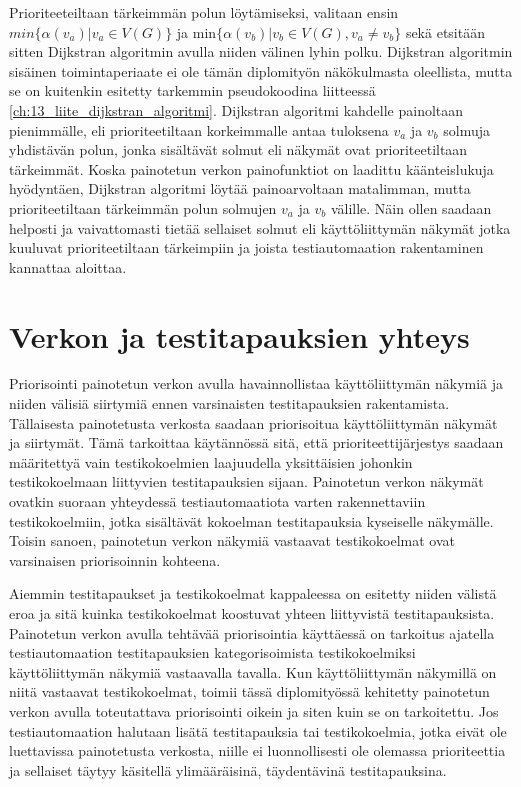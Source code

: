   Prioriteeteiltaan tärkeimmän polun löytämiseksi, valitaan ensin \(min\{\alpha(v_a) | v_a \in V(G)\}\) ja \(\text{min}\{\alpha(v_b) | v_b \in V(G), v_a \neq v_b\}\) sekä etsitään sitten Dijkstran algoritmin avulla niiden välinen lyhin polku.
  Dijkstran algoritmin sisäinen toimintaperiaate ei ole tämän diplomityön näkökulmasta oleellista, mutta se on kuitenkin esitetty tarkemmin pseudokoodina liitteessä \ref{ch:13_liite_dijkstran_algoritmi}.
  Dijkstran algoritmi kahdelle painoltaan pienimmälle, eli prioriteetiltaan korkeimmalle antaa tuloksena \(v_a\) ja \(v_b\) solmuja yhdistävän polun, jonka sisältävät solmut eli näkymät ovat prioriteetiltaan tärkeimmät.
  Koska painotetun verkon painofunktiot on laadittu käänteislukuja hyödyntäen, Dijkstran algoritmi löytää painoarvoltaan matalimman, mutta prioriteetiltaan tärkeimmän polun solmujen \(v_a\) ja \(v_b\) välille.
  Näin ollen saadaan helposti ja vaivattomasti tietää sellaiset solmut eli käyttöliittymän näkymät jotka kuuluvat prioriteetiltaan tärkeimpiin ja joista testiautomaation rakentaminen kannattaa aloittaa.

\section{Verkon ja testitapauksien yhteys} \label{ch:10_verkon_ja_testitapauksien_yhteys}

  Priorisointi painotetun verkon avulla havainnollistaa käyttöliittymän näkymiä ja niiden välisiä siirtymiä ennen varsinaisten testitapauksien rakentamista.
  Tällaisesta painotetusta verkosta saadaan priorisoitua käyttöliittymän näkymät ja siirtymät.
  Tämä tarkoittaa käytännössä sitä, että prioriteettijärjestys saadaan määritettyä vain testikokoelmien laajuudella yksittäisien johonkin testikokoelmaan liittyvien testitapauksien sijaan.
  Painotetun verkon näkymät ovatkin suoraan yhteydessä testiautomaatiota varten rakennettaviin testikokoelmiin, jotka sisältävät kokoelman testitapauksia kyseiselle näkymälle.
  Toisin sanoen, painotetun verkon näkymiä vastaavat testikokoelmat ovat varsinaisen priorisoinnin kohteena.

  Aiemmin testitapaukset ja testikokoelmat kappaleessa on esitetty niiden välistä eroa ja sitä kuinka testikokoelmat koostuvat yhteen liittyvistä testitapauksista.
  Painotetun verkon avulla tehtävää priorisointia käyttäessä on tarkoitus ajatella testiautomaation testitapauksien kategorisoimista testikokoelmiksi käyttöliittymän näkymiä vastaavalla tavalla.
  Kun käyttöliittymän näkymillä on niitä vastaavat testikokoelmat, toimii tässä diplomityössä kehitetty painotetun verkon avulla toteutattava priorisointi oikein ja siten kuin se on tarkoitettu.
  Jos testiautomaation halutaan lisätä testitapauksia tai testikokoelmia, jotka eivät ole luettavissa painotetusta verkosta, niille ei luonnollisesti ole olemassa prioriteettia ja sellaiset täytyy käsitellä ylimääräisinä, täydentävinä testitapauksina.

